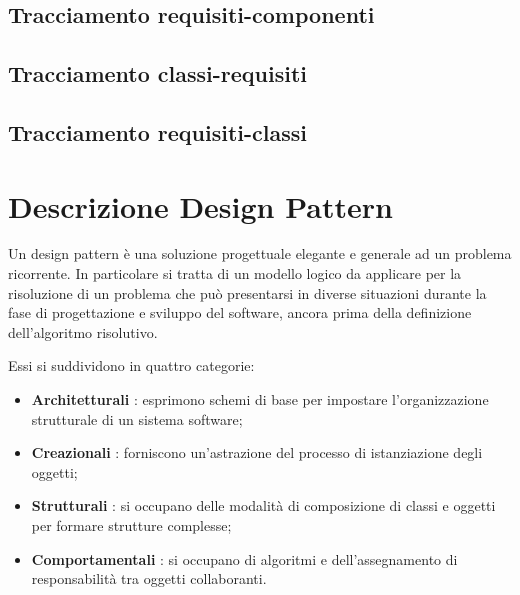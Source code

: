 \subsection{Tracciamento requisiti-componenti}


\subsection{Tracciamento classi-requisiti}

\subsection{Tracciamento requisiti-classi}




\appendix

\section{Descrizione Design Pattern}

Un design pattern è una soluzione progettuale elegante e generale ad
un problema ricorrente. In particolare si tratta di un
modello logico da applicare per la risoluzione di un problema che può
presentarsi in diverse situazioni durante la fase di progettazione e
sviluppo del software, ancora prima della definizione dell'algoritmo
risolutivo. 

Essi si suddividono in quattro categorie: 


\begin{itemize}
	\item \textbf{Architetturali }: esprimono schemi di base per impostare l'organizzazione strutturale di un sistema software;
	\item \textbf{Creazionali }: forniscono un'astrazione del processo di istanziazione degli oggetti;
	\item \textbf{Strutturali }: si occupano delle modalità di composizione di classi e oggetti per formare strutture complesse;
	\item \textbf{Comportamentali }: si occupano di algoritmi e dell'assegnamento di responsabilità tra oggetti collaboranti.

\end{itemize}

